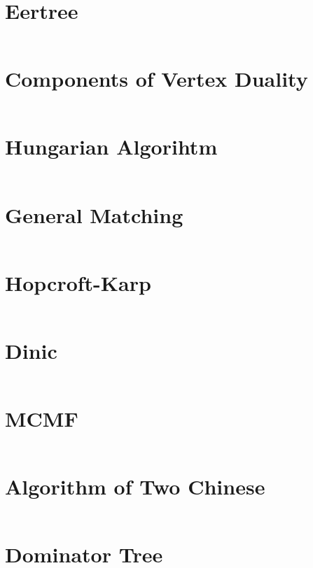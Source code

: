 \documentclass{article}
\begin{document}
\begin{multicols}{2}
\section*{Eertree}
\inputminted[frame=single,breaklines]{cpp}{../eer-tree.cpp}

\section*{Components of Vertex Duality}
\inputminted[frame=single,breaklines]{cpp}{../componentsOfVertexDuality.cpp}

\section*{Hungarian Algorihtm}
\inputminted[frame=single,breaklines]{cpp}{../hungarian.cpp}

\section*{General Matching}
\inputminted[frame=single,breaklines]{cpp}{../general_matching.cpp}

\section*{Hopcroft-Karp}
\inputminted[frame=single,breaklines]{cpp}{../hopcroft-karp.cpp}

\section*{Dinic}
\inputminted[frame=single,breaklines]{cpp}{../Dinic.cpp}

\section*{MCMF}
\inputminted[frame=single,breaklines]{cpp}{../MCMF.cpp}

\section*{Algorithm of Two Chinese}
\inputminted[frame=single,breaklines]{cpp}{../2-chinese.cpp}

\section*{Dominator Tree}
\inputminted[frame=single,breaklines]{cpp}{../dominator_tree.cpp}


\end{multicols}
\end{document}
